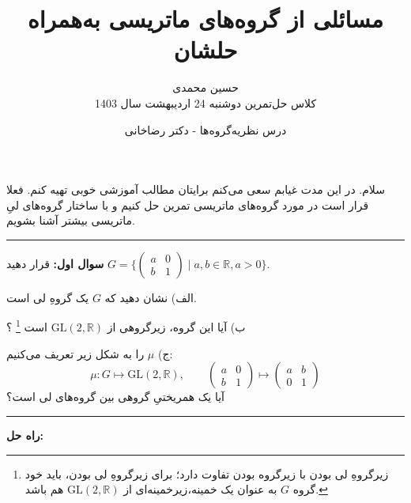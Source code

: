 \documentclass[a4paper, 12pt]{article}
\title{\textbf{
  مسائلی از گروه‌های ماتریسی به‌همراه حلشان
}}
\author{حسین محمدی
\\
\small
کلاس‌ حل‌تمرین دوشنبه 24 اردیبهشت سال 1403
}
\date{درس نظریه‌گروه‌ها - دکتر رضاخانی}
\begin{document}
\maketitle
سلام. در این مدت غیابم سعی می‌کنم برایتان مطالب آموزشی خوبی تهیه کنم. فعلا قرار است در مورد گروه‌های ماتریسی تمرین حل کنیم و با ساختار گروه‌های لیِ ماتریسی بیشتر آشنا بشویم.
\par\noindent\rule{\textwidth}{2pt}

\vspace{0.5em}
\noindent
\textbf{سوال اول:}
قرار دهید
$G = \Biggl\{
\begin{pmatrix}
	a &0 \\ b &1 
\end{pmatrix} \; | \; a,b\in \mathbb{R} , a>0
\Biggr\}$.

\hspace{7mm}
الف) نشان دهید که $G$ یک گروهِ لی است.

\hspace{7mm}
ب) آیا این گروه، زیرگروهی از 
$\text{GL}(2,\mathbb{R})$
است
\footnote{زیرگروهِ لی بودن با زیرگروه بودن تفاوت دارد؛ برای زیرگروهِ لی بودن، باید خود گروه $G$ به عنوان یک خمینه،‌زیرخمینه‌ای از 
$\text{GL}(2,\mathbb{R})$
هم باشد.}
؟

\hspace{7mm}
ج) $\mu$ را به شکل زیر تعریف می‌کنیم:
\[
\mu : G \mapsto \text{GL}(2,\mathbb{R}) , \qquad
\begin{pmatrix}
	a &0 \\ b & 1
\end{pmatrix} \longmapsto \begin{pmatrix}
 a& b \\ 0 & 1
\end{pmatrix}
\]
\hspace{7mm}
 آیا یک همریختیِ گروهی بین گروه‌های لی است؟

\vspace{1.5em}
\par\noindent\rule{\textwidth}{0.6pt}
\textbf{راه حل:}
\end{document}
